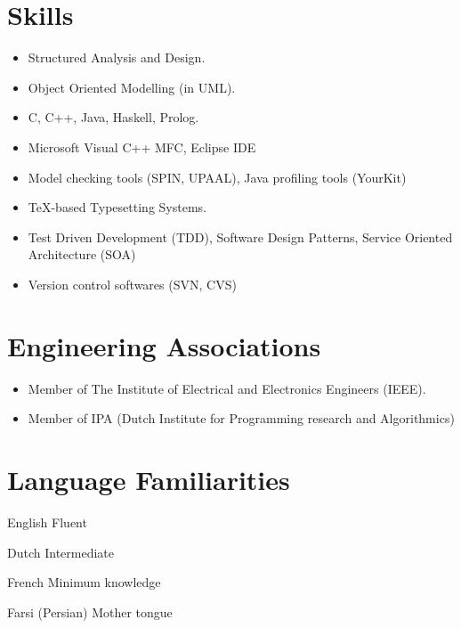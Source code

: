 \documentclass[a4paper]{article}
\begin{document}
\section{Skills}
\begin{itemize}
\item Structured Analysis and Design.

\item Object Oriented Modelling (in UML).

\item C, C++, Java, Haskell, Prolog.

\item Microsoft Visual C++ MFC, Eclipse IDE

\item Model checking tools (SPIN, UPAAL), Java profiling tools (YourKit)

\item \TeX-based Typesetting Systems.

\item Test Driven Development (TDD), Software Design Patterns, Service Oriented Architecture (SOA)


\item Version control softwares (SVN, CVS)
\end{itemize}

\section{Engineering Associations}
\begin{itemize}

\item Member of The Institute of Electrical and Electronics
Engineers (IEEE).

\item Member of IPA (Dutch Institute for Programming research and Algorithmics)

\end{itemize}

\section{Language Familiarities}
\begin{CV}
\item [English] Fluent
\item [Dutch] Intermediate
\item [French] Minimum knowledge
\item [Farsi (Persian)]  Mother tongue
\end{CV}
\end{document}
